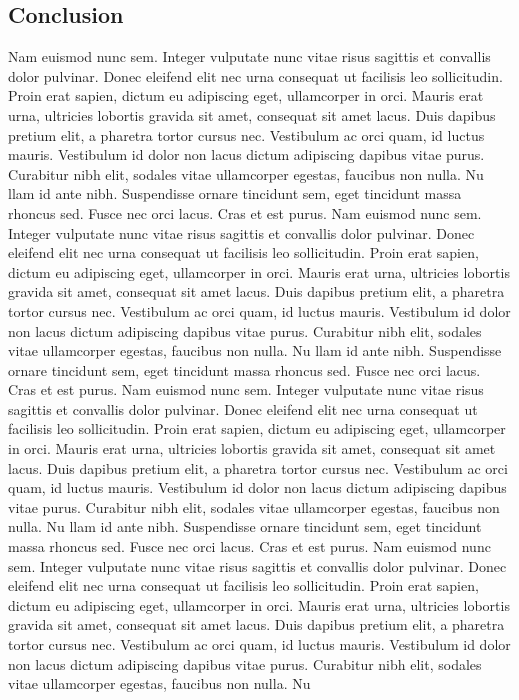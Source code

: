 \documentclass{article}
\begin{document}
\begin{multicols*}{2}
\section{Conclusion}
Nam euismod nunc sem. Integer vulputate nunc vitae risus sagittis et convallis dolor pulvinar. Donec eleifend elit nec urna consequat ut facilisis leo sollicitudin. Proin erat sapien, dictum eu adipiscing eget, ullamcorper in orci. Mauris erat urna, ultricies lobortis gravida sit amet, consequat sit amet lacus. Duis dapibus pretium elit, a pharetra tortor cursus nec. Vestibulum ac orci quam, id luctus mauris. Vestibulum id dolor non lacus dictum adipiscing dapibus vitae purus. Curabitur nibh elit, sodales vitae ullamcorper egestas, faucibus non nulla. Nu
llam id ante nibh. Suspendisse ornare tincidunt sem, eget tincidunt massa rhoncus sed. Fusce nec orci lacus. Cras et est purus.
Nam euismod nunc sem. Integer vulputate nunc vitae risus sagittis et convallis dolor pulvinar. Donec eleifend elit nec urna consequat ut facilisis leo sollicitudin. Proin erat sapien, dictum eu adipiscing eget, ullamcorper in orci. Mauris erat urna, ultricies lobortis gravida sit amet, consequat sit amet lacus. Duis dapibus pretium elit, a pharetra tortor cursus nec. Vestibulum ac orci quam, id luctus mauris. Vestibulum id dolor non lacus dictum adipiscing dapibus vitae purus. Curabitur nibh elit, sodales vitae ullamcorper egestas, faucibus non nulla. Nu
llam id ante nibh. Suspendisse ornare tincidunt sem, eget tincidunt massa rhoncus sed. Fusce nec orci lacus. Cras et est purus.
Nam euismod nunc sem. Integer vulputate nunc vitae risus sagittis et convallis dolor pulvinar. Donec eleifend elit nec urna consequat ut facilisis leo sollicitudin. Proin erat sapien, dictum eu adipiscing eget, ullamcorper in orci. Mauris erat urna, ultricies lobortis gravida sit amet, consequat sit amet lacus. Duis dapibus pretium elit, a pharetra tortor cursus nec. Vestibulum ac orci quam, id luctus mauris. Vestibulum id dolor non lacus dictum adipiscing dapibus vitae purus. Curabitur nibh elit, sodales vitae ullamcorper egestas, faucibus non nulla. Nu
llam id ante nibh. Suspendisse ornare tincidunt sem, eget tincidunt massa rhoncus sed. Fusce nec orci lacus. Cras et est purus.
Nam euismod nunc sem. Integer vulputate nunc vitae risus sagittis et convallis dolor pulvinar. Donec eleifend elit nec urna consequat ut facilisis leo sollicitudin. Proin erat sapien, dictum eu adipiscing eget, ullamcorper in orci. Mauris erat urna, ultricies lobortis gravida sit amet, consequat sit amet lacus. Duis dapibus pretium elit, a pharetra tortor cursus nec. Vestibulum ac orci quam, id luctus mauris. Vestibulum id dolor non lacus dictum adipiscing dapibus vitae purus. Curabitur nibh elit, sodales vitae ullamcorper egestas, faucibus non nulla. Nu

\end{multicols*}
\end{document}
